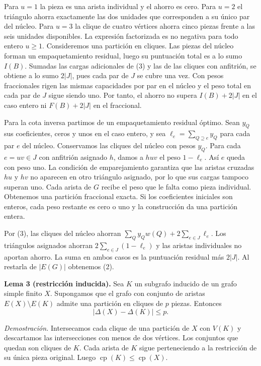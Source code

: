 \documentclass[spanish,11pt,a4paper]{article}
\begin{document}
Para \(u=1\) la pieza es una arista individual y el ahorro es cero. Para \(u=2\) el triángulo ahorra exactamente las dos unidades que corresponden a su único par del núcleo. Para \(u=3\) la clique de cuatro vértices ahorra cinco piezas frente a las seis unidades disponibles. La expresión factorizada es no negativa para todo entero \(u\ge1\). Consideremos una partición en cliques. Las piezas del núcleo forman un empaquetamiento residual, luego su puntuación total es a lo sumo \(I(B)\). Sumadas las cargas adicionales de (3) y las de las cliques con anfitrión, se obtiene a lo sumo \(2|J|\), pues cada par de \(J\) se cubre una vez. Con pesos fraccionales rigen las mismas capacidades por par en el núcleo y el peso total en cada par de \(J\) sigue siendo uno. Por tanto, el ahorro no supera \(I(B)+2|J|\) en el caso entero ni \(F(B)+2|J|\) en el fraccional.

Para la cota inversa partimos de un empaquetamiento residual óptimo. Sean \(y_Q\) sus coeficientes, ceros y unos en el caso entero, y sea \(\ell_e=\sum_{Q\supseteq e}y_Q\) para cada par \(e\) del núcleo. Conservamos las cliques del núcleo con pesos \(y_Q\). Para cada \(e=uv\in J\) con anfitrión asignado \(h\), damos a \(huv\) el peso \(1-\ell_e\). Así \(e\) queda con peso uno. La condición de emparejamiento garantiza que las aristas cruzadas \(hu\) y \(hv\) no aparecen en otro triángulo asignado, por lo que sus cargas tampoco superan uno. Cada arista de \(G\) recibe el peso que le falta como pieza individual. Obtenemos una partición fraccional exacta. Si los coeficientes iniciales son enteros, cada peso restante es cero o uno y la construcción da una partición entera.

Por (3), las cliques del núcleo ahorran \(\sum_Q y_Qw(Q)+2\sum_{e\in J}\ell_e\). Los triángulos asignados ahorran \(2\sum_{e\in J}(1-\ell_e)\) y las aristas individuales no aportan ahorro. La suma en ambos casos es la puntuación residual más \(2|J|\). Al restarla de \(|E(G)|\) obtenemos (2).

\textbf{Lema 3 (restricción inducida).} Sea \(K\) un subgrafo inducido de un grafo simple finito \(X\). Supongamos que el grafo con conjunto de aristas \(E(X)\setminus E(K)\) admite una partición en cliques de \(p\) piezas. Entonces
\[
|\Delta(X)-\Delta(K)|\le p. \tag{4}
\]

\emph{Demostración.} Intersecamos cada clique de una partición de \(X\) con \(V(K)\) y descartamos las intersecciones con menos de dos vértices. Los conjuntos que quedan son cliques de \(K\). Cada arista de \(K\) sigue perteneciendo a la restricción de su única pieza original. Luego \(\operatorname{cp}(K)\le\operatorname{cp}(X)\).
\end{document}
